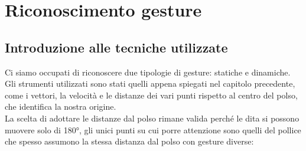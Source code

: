 \chapter{Riconoscimento gesture}

\section{Introduzione alle tecniche utilizzate}

Ci siamo occupati di riconoscere due tipologie di gesture: statiche e dinamiche.\\
Gli strumenti utilizzati sono stati quelli appena spiegati nel capitolo precedente, come i vettori, 
la velocità e le distanze dei vari punti rispetto al centro del polso, che identifica la nostra origine.\\
La scelta di adottare le distanze dal polso rimane valida perché le dita si possono muovere solo di 180°, gli unici punti su cui porre attenzione sono quelli del pollice che spesso assumono la stessa distanza dal polso con gesture diverse:

